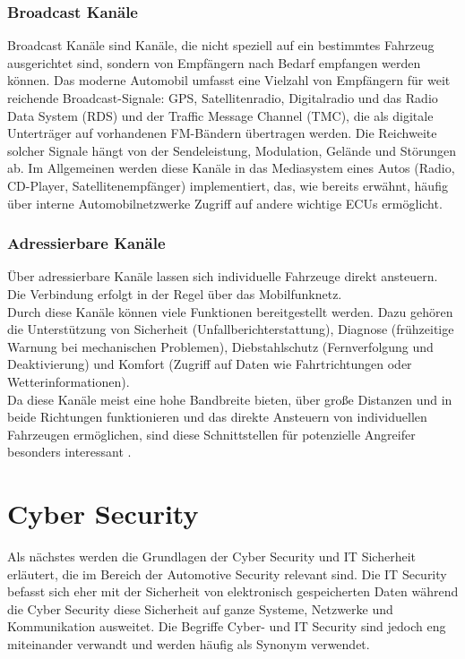\subsubsection{Broadcast Kanäle}
Broadcast Kanäle sind Kanäle, die nicht speziell auf ein bestimmtes Fahrzeug ausgerichtet sind, sondern von Empfängern nach Bedarf empfangen werden können. 
Das moderne Automobil umfasst eine Vielzahl von Empfängern für weit reichende Broadcast-Signale: \ac{GPS}, Satellitenradio, Digitalradio und das Radio Data System (RDS) und der Traffic Message Channel (TMC), die als digitale Unterträger auf vorhandenen FM-Bändern übertragen werden. Die Reichweite solcher Signale hängt von der Sendeleistung, Modulation, Gelände und Störungen ab. Im Allgemeinen werden diese Kanäle in das Mediasystem eines Autos (Radio, CD-Player, Satellitenempfänger) implementiert, das, wie bereits erwähnt, häufig über interne Automobilnetzwerke Zugriff auf andere wichtige \acsp{ECU} ermöglicht. \cite[4\psq]{Checkoway.2011}

\subsubsection{Adressierbare Kanäle}
Über adressierbare Kanäle lassen sich individuelle Fahrzeuge direkt ansteuern. Die Verbindung erfolgt in der Regel über das Mobilfunknetz.\\
Durch diese Kanäle können viele Funktionen bereitgestellt werden. Dazu gehören die Unterstützung von Sicherheit (Unfallberichterstattung), Diagnose (frühzeitige Warnung bei mechanischen Problemen), Diebstahlschutz (Fernverfolgung und Deaktivierung) und Komfort (Zugriff auf Daten wie Fahrtrichtungen oder Wetterinformationen). \cite[5]{Checkoway.2011} \\
Da diese Kanäle meist eine hohe Bandbreite bieten, über große Distanzen und in beide Richtungen funktionieren und das direkte Ansteuern von individuellen Fahrzeugen ermöglichen, sind diese Schnittstellen für potenzielle Angreifer besonders interessant \cite[5]{Checkoway.2011}.




\section{Cyber Security}
Als nächstes werden die Grundlagen der Cyber Security und IT Sicherheit erläutert, die im Bereich der Automotive Security relevant sind. Die IT Security befasst sich eher mit der Sicherheit von elektronisch gespeicherten Daten während die Cyber Security diese Sicherheit auf ganze Systeme, Netzwerke und Kommunikation ausweitet.
Die Begriffe Cyber- und IT Security sind jedoch eng miteinander verwandt und werden häufig als Synonym verwendet.

